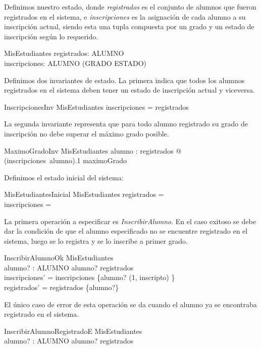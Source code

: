 \documentclass{article}
\begin{document}
Definimos nuestro estado, donde \emph{registrados} es el conjunto de alumnos que fueron registrados en el sistema, e \emph{inscripciones} es la asignación de cada alumno a su inscripción actual, siendo esta una tupla compuesta por un grado y un estado de inscripción según lo requerido.
\begin{schema}{MisEstudiantes}
  registrados: \power ALUMNO \\
  inscripciones: ALUMNO \pfun (GRADO \cross ESTADO)
\end{schema}

Definimos dos invariantes de estado. La primera indica que todos los alumnos registrados en el sistema deben tener un estado de inscripción actual y viceversa.
\begin{schema}{InscripcionesInv}
  MisEstudiantes
  \where
  \dom inscripciones = registrados
\end{schema}

La segunda invariante representa que para todo alumno registrado su grado de inscripción no debe superar el máximo grado posible.
\begin{schema}{MaximoGradoInv}
    MisEstudiantes
    \where
    \forall alumno : registrados @ (inscripciones~alumno).1 \leq maximoGrado
\end{schema}

Definimos el estado inicial del sistema:
\begin{schema}{MisEstudiantesInicial}
    MisEstudiantes
    \where
    registrados = \emptyset \\
    inscripciones = \emptyset
\end{schema}

La primera operación a especificar es \emph{InscribirAlumno}. En el caso exitoso se debe dar la condición de que el alumno especificado no se encuentre registrado en el sistema, luego se lo registra y se lo inscribe a primer grado.
\begin{schema}{InscribirAlumnoOk}
    \Delta MisEstudiantes \\
    alumno? : ALUMNO
    \where
    alumno? \notin registrados \\
    inscripciones' = inscripciones \cup \{alumno? \mapsto (1, inscripto) \} \\
    registrados' = registrados \cup \{alumno?\}
\end{schema}

El único caso de error de esta operación se da cuando el alumno ya se encontraba registrado en el sistema.
\begin{schema}{InscribirAlumnoRegistradoE}
    \Xi MisEstudiantes \\
    alumno? : ALUMNO
    \where
    alumno? \in registrados
\end{schema}
\end{document}
